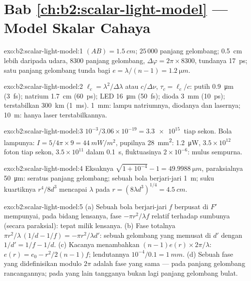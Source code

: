 \section*{Bab \ref{ch:b2:scalar-light-model} --- Model Skalar Cahaya}

\begin{solution}{exo:b2:scalar-light-model:1}
$(AB) = \qty{1.5}{cm}$; $25\,000$ panjang gelombang; \qty{0.5}{cm} lebih daripada udara, $8300$
panjang gelombang, $\Delta\varphi = 2\pi \times 8300$, tundanya \qty{17}{ps}; satu panjang gelombang
tunda bagi $e = \lambda/(n - 1) = \qty{1.2}{\micro m}$.
\end{solution}

\begin{solution}{exo:b2:scalar-light-model:2}
$\ell_c = \lambda^2/\Delta\lambda$ atau $c/\Delta\nu$, $\tau_c = \ell_c/c$: putih \qty{0.9}{\micro m} (\qty{3}{fs});
natrium \qty{1.7}{cm} (\qty{60}{ps}); LED \qty{16}{\micro m} (\qty{50}{fs}); dioda \qty{3}{mm}
(\qty{10}{ps}); terstabilkan \qty{300}{km} (\qty{1}{ms}). \qty{1}{mm}: lampu natriumnya,
diodanya dan lasernya; \qty{10}{m}: hanya laser terstabilkannya.
\end{solution}

\begin{solution}{exo:b2:scalar-light-model:3}
$10^{-3}/3.06 \times 10^{-19} = \qty{3.3e15}{}$ tiap sekon. Bola lampunya: $I = 5/4\pi \times 9 =
\qty{44}{mW/m^2}$, pupilnya \qty{28}{mm^2}: \qty{1.2}{\micro W}, $3.5 \times 10^{12}$ foton tiap sekon,
$3.5 \times 10^{11}$ dalam \qty{0.1}{s}, fluktuasinya $2 \times 10^{-6}$: mulus sempurna.
\end{solution}

\begin{solution}{exo:b2:scalar-light-model:4}
Eksaknya $\sqrt{1 + 10^{-4}} - 1 = \qty{49.9988}{\micro m}$, paraksialnya \qty{50}{\micro m}: seratus
panjang gelombang;  sebuah bola berjari-jari \qty{1}{m};
suku kuartiknya $r^4/8d^3$ mencapai $\lambda$ pada $r = (8\lambda d^3)^{1/4} = \qty{4.5}{cm}$.
\end{solution}

\begin{solution}{exo:b2:scalar-light-model:5}
(a) Sebuah bola berjari-jari $f$ berpusat di $F'$ mempunyai, pada bidang lensanya,
fase $-\pi r^2/\lambda f$ relatif terhadap sumbunya (secara paraksial): tepat
milik lensanya. (b) Fase totalnya $\pi r^2/\lambda\,(1/d - 1/f) = -\pi r^2/\lambda d'$: sebuah gelombang
yang memusat di $d'$ dengan $1/d' = 1/f - 1/d$. (c) Kacanya menambahkan $(n - 1)e(r)
\times2\pi/\lambda$: $e(r) = e_0 - r^2/2(n - 1)f$; lendutannya $10^{-4}/0.1 = \qty{1}{mm}$. (d) Sebuah
fase yang didefinisikan modulo $2\pi$ adalah fase yang sama --- pada panjang gelombang
rancangannya; pada yang lain tangganya bukan lagi panjang gelombang bulat.
\end{solution}

